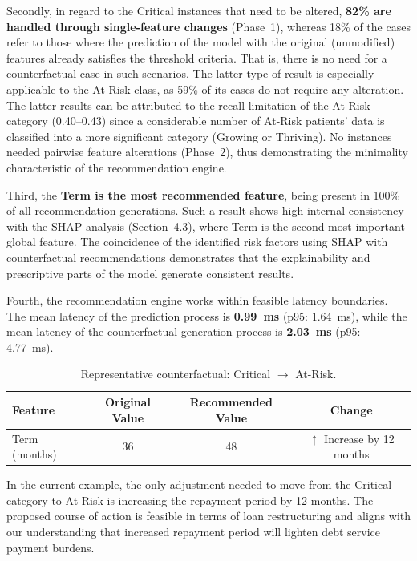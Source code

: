 Secondly, in regard to the Critical instances that need to be altered, \textbf{82\% are handled through single-feature changes} (Phase~1), whereas 18\% of the cases refer to those where the prediction of the model with the original (unmodified) features already satisfies the threshold criteria. That is, there is no need for a counterfactual case in such scenarios. The latter type of result is especially applicable to the At-Risk class, as 59\% of its cases do not require any alteration. The latter results can be attributed to the recall limitation of the At-Risk category (0.40--0.43) since a considerable number of At-Risk patients' data is classified into a more significant category (Growing or Thriving). No instances needed pairwise feature alterations (Phase~2), thus demonstrating the minimality characteristic of the recommendation engine.

Third, the \textbf{Term is the most recommended feature}, being present in 100\% of all recommendation generations. Such a result shows high internal consistency with the SHAP analysis (Section~4.3), where Term is the second-most important global feature. The coincidence of the identified risk factors using SHAP with counterfactual recommendations demonstrates that the explainability and prescriptive parts of the model generate consistent results.

Fourth, the recommendation engine works within feasible latency boundaries. The mean latency of the prediction process is \textbf{0.99~ms} (p95: 1.64~ms), while the mean latency of the counterfactual generation process is \textbf{2.03~ms} (p95: 4.77~ms).

\begin{table}[htbp]
\centering
\caption{Representative counterfactual: Critical $\rightarrow$ At-Risk.}
\label{tab:cf_example}
\begin{tabular}{lccc}
\hline
\textbf{Feature} & \textbf{Original Value} & \textbf{Recommended Value} & \textbf{Change} \\
\hline
Term (months) & 36 & 48 & $\uparrow$ Increase by 12 months \\
\hline
\end{tabular}
\end{table}

In the current example, the only adjustment needed to move from the Critical category to At-Risk is increasing the repayment period by 12 months. The proposed course of action is feasible in terms of loan restructuring and aligns with our understanding that increased repayment period will lighten debt service payment burdens.
